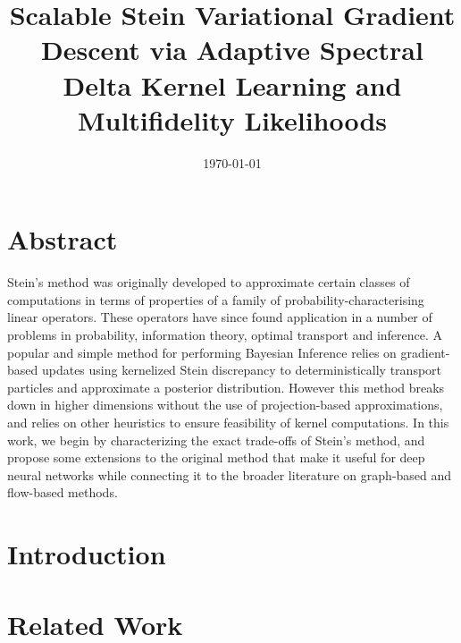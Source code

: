 \documentclass[12pt]{article}
\title{Scalable Stein Variational Gradient Descent via Adaptive Spectral Delta Kernel Learning and Multifidelity Likelihoods}
\author{}
\date{\today}
\renewcommand{\[}{\left[}
\renewcommand{\]}{\right]}
\renewcommand{\(}{\left(}
\renewcommand{\)}{\right)}
\begin{document}
\maketitle
\section*{Abstract}
Stein's method was originally developed to approximate certain classes of computations in terms of properties of a family of probability-characterising linear operators. These operators have since found application in a number of problems in probability, information theory, optimal transport and inference. A popular and simple method for performing Bayesian Inference relies on gradient-based updates using kernelized Stein discrepancy to deterministically transport particles and approximate a posterior distribution. However this method breaks down in higher dimensions without the use of projection-based approximations, and relies on other heuristics to ensure feasibility of kernel computations. In this work, we begin by characterizing the exact trade-offs of Stein's method, and propose some extensions to the original method that make it useful for deep neural networks while connecting it to the broader literature on graph-based and flow-based methods.



\section{Introduction}



\section{Related Work}
\end{document}
